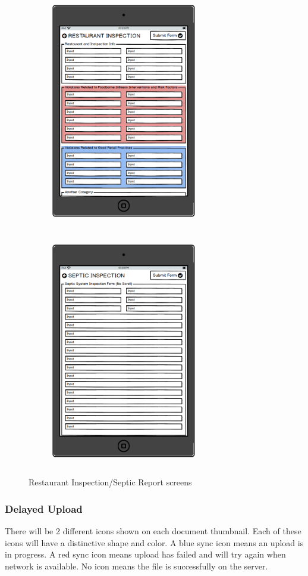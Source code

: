 \documentclass[twoside,letterpaper]{article}
\begin{document}
{\begin{figure}
    \centering
    \begin{subfigure}[H]{0.4\textwidth}
  \includegraphics[width=2.5in,height=4in]{Restaurant_Data_Entry_Form.png}
    \end{subfigure}
    \qquad 
    \begin{subfigure}[H]{0.4\textwidth}
  \includegraphics[width=2.5in,height=4in]{Septic_Data_Entry_Form.png}
    \end{subfigure}
     \caption{Restaurant Inspection/Septic Report screens}
\end{figure}

\newpage
\subsubsection[Delayed Upload]{\rmfamily\bfseries\color{black}
Delayed Upload}
There will be 2 different icons shown on each document thumbnail. Each of these icons will have a distinctive shape and color. A blue sync icon means an upload is in progress. A red sync icon means upload has failed and will try again when network is available. No icon means the file is successfully on the server.
\newline

}
\end{document}

